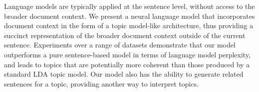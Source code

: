 Language models are typically applied at the sentence level, without access to the broader document context.  We present a neural language model that incorporates document context in the form of a topic model-like architecture, thus providing a succinct representation of the broader document context outside of the current sentence.  Experiments over a range of datasets demonstrate that our model outperforms a pure sentence-based model in terms of language model perplexity, and leads to topics that are potentially more coherent than those produced by a standard LDA topic model.  Our model also has the ability to generate related sentences for a topic, providing another way to interpret topics.

